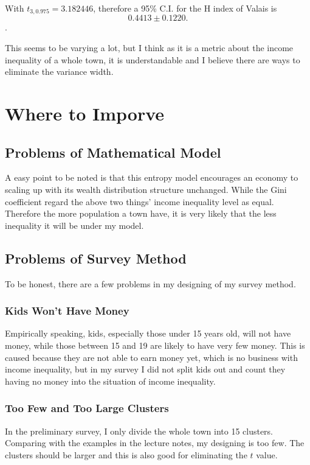 \documentclass[12pt]{article}%
\begin{document}
With $t_{3,0.975}=3.182446$, therefore a 95\% C.I. for the H index of Valais is $$0.4413 \pm 0.1220.$$.

This seems to be varying a lot, but I think as it is a metric about the income inequality of a whole town, it is understandable and I believe there are ways to eliminate the variance width.



\section{Where to Imporve}

\subsection{Problems of Mathematical Model}
A easy point to be noted is that this entropy model encourages an economy to scaling up with its wealth distribution structure unchanged. 
While the Gini coefficient regard the above two things' income inequality level as equal. Therefore the more population a town have, it is very likely that the less inequality it will be under my model.

\subsection{Problems of Survey Method}
To be honest, there are a few problems in my designing of my survey method.

\subsubsection{Kids Won't Have Money}
Empirically speaking, kids, especially those under 15 years old, will not have money, while those between 15 and 19 are likely to have very few money.
This is caused because they are not able to earn money yet, which is no business with income inequality, but in my survey I did not split kids out and 
count they having no money into the situation of income inequality.

\subsubsection{Too Few and Too Large Clusters}
In the preliminary survey, I only divide the whole town into 15 clusters. Comparing with the examples in the lecture notes, my designing is too few. The clusters should be larger and this is also good for eliminating the $t$ value.
\end{document}
